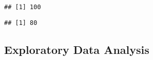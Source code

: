 \documentclass[
  12pt,
]{article}
\newenvironment{Shaded}{\begin{snugshade}}{\end{snugshade}}
\newcommand{\NormalTok}[1]{#1}
\newcommand{\SpecialCharTok}[1]{\textcolor[rgb]{0.00,0.00,0.00}{#1}}
\begin{document}
\begin{Shaded}
\end{Shaded}

\begin{verbatim}
## [1] 100
\end{verbatim}

\begin{Shaded}
\end{Shaded}

\begin{verbatim}
## [1] 80
\end{verbatim}

\hypertarget{exploratory-data-analysis}{%
\subsection{Exploratory Data Analysis}\label{exploratory-data-analysis}}

\hypertarget{section}{%
\subsection{}\label{section}}
\end{document}
